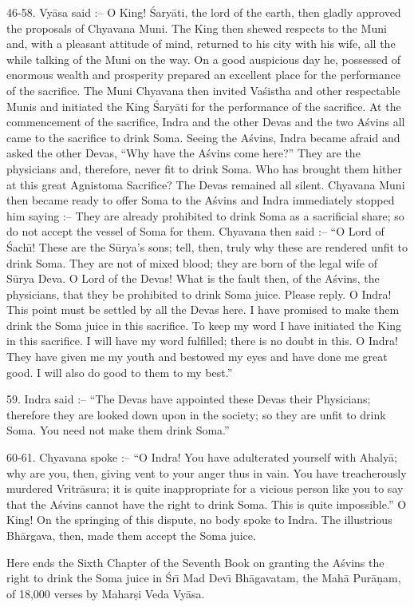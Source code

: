 46-58. Vy\=asa said :-- O King! \'Sary\=ati, the lord of the earth, then gladly approved the proposals of Chyavana Muni. The King then shewed respects to the Muni and, with a pleasant attitude of mind, returned to his city with his wife, all the while talking of the Muni on the way. On a good auspicious day he, possessed of enormous wealth and prosperity prepared an excellent place for the performance of the sacrifice. The Muni Chyavana then invited Va\'sistha and other respectable Munis and initiated the King \'Sary\=ati for the performance of the sacrifice. At the commencement of the sacrifice, Indra and the other Devas and the two A\'svins all came to the sacrifice to drink Soma. Seeing the A\'svins, Indra became afraid and asked the other Devas, ``Why have the A\'svins come here?'' They are the physicians and, therefore, never fit to drink Soma. Who has brought them hither at this great Agnistoma Sacrifice? The Devas remained all silent. Chyavana Muni then became ready to offer Soma to the A\'svins and Indra immediately stopped him saying :-- They are already prohibited to drink Soma as a sacrificial share; so do not accept the vessel of Soma for them. Chyavana then said :-- ``O Lord of \'Sach\={\i}! These are the S\=urya's sons; tell, then, truly why these are rendered unfit to drink Soma. They are not of mixed blood; they are born of the legal wife of S\=urya Deva. O Lord of the Devas! What is the fault then, of the A\'svins, the physicians, that they be prohibited to drink Soma juice. Please reply. O Indra! This point must be settled by all the Devas here. I have promised to make them drink the Soma juice in this sacrifice. To keep my word I have initiated the King in this sacrifice. I will have my word fulfilled; there is no doubt in this. O Indra! They have given me my youth and bestowed my eyes and have done me great good. I will also do good to them to my best.''

59. Indra said :-- ``The Devas have appointed these Devas their Physicians; therefore they are looked down upon in the society; so they are unfit to drink Soma. You need not make them drink Soma.''

60-61. Chyavana spoke :-- ``O Indra! You have adulterated yourself with Ahaly\=a; why are you, then, giving vent to your anger thus in vain. You have treacherously murdered Vritr\=asura; it is quite inappropriate for a vicious person like you to say that the A\'svins cannot have the right to drink Soma. This is quite impossible.'' O King! On the springing of this dispute, no body spoke to Indra. The illustrious Bh\=argava, then, made them accept the Soma juice.

Here ends the Sixth Chapter of the Seventh Book on granting the A\'svins the right to drink the Soma juice in \'Sr\={\i} Mad Dev\={\i} Bh\=agavatam, the Mah\=a Pur\=a\d{n}am, of 18,000 verses by Mahar\d{s}i Veda Vy\=asa.



